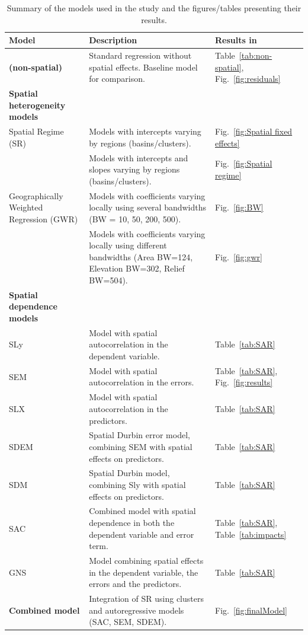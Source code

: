 \documentclass[lineno,pdflatex,sn-basic]{sn-jnl}%
\theoremstyle{thmstyleone}%
\theoremstyle{thmstyletwo}%
\theoremstyle{thmstylethree}%
\begin{document}
\begin{table}[htbp]
\centering
\caption{Summary of the models used in the study and the figures/tables presenting their results.}
\label{tab:model_summary}
\begin{tabular}{p{4cm} p{6cm} p{3cm}}
\toprule
\textbf{Model} & \textbf{Description} & \textbf{Results in} \\
\midrule
\textbf{(non-spatial)} & Standard regression without spatial effects. Baseline model for comparison. & Table~\ref{tab:non-spatial}, Fig.~\ref{fig:residuals} \\
\textbf{Spatial heterogeneity models} &  &  \\
\quad Spatial Regime (SR) & Models with intercepts varying by regions (basins/clusters). & Fig.~\ref{fig:Spatial fixed effects} \\
\quad  & Models with intercepts and slopes varying by regions (basins/clusters). & Fig.~\ref{fig:Spatial regime} \\
\quad Geographically Weighted Regression (GWR) & Models with coefficients varying locally using several bandwidths (BW = 10, 50, 200, 500). & Fig.~\ref{fig:BW} \\
\quad & Models with coefficients varying locally using different bandwidths (Area BW=124, Elevation BW=302, Relief BW=504). & Fig.~\ref{fig:gwr} \\
\textbf{Spatial dependence models} &  &  \\
\quad SLy & Model with spatial autocorrelation in the dependent variable. & Table~\ref{tab:SAR} \\
\quad SEM & Model with spatial autocorrelation in the errors. & Table~\ref{tab:SAR}, Fig.~\ref{fig:results} \\
\quad SLX & Model with spatial autocorrelation in the predictors. & Table~\ref{tab:SAR} \\
\quad SDEM & Spatial Durbin error model, combining SEM with spatial effects on predictors. & Table~\ref{tab:SAR} \\
\quad SDM & Spatial Durbin model, combining Sly with spatial effects on predictors. & Table~\ref{tab:SAR} \\
\quad SAC & Combined model with spatial dependence in both the dependent variable and error term. & Table~\ref{tab:SAR}, Table~\ref{tab:impacts} \\
\quad GNS & Model combining spatial effects in the dependent variable, the errors and the predictors. & Table~\ref{tab:SAR} \\
\textbf{Combined model} & Integration of SR using clusters and autoregressive models (SAC, SEM, SDEM). & Fig.~\ref{fig:finalModel} \\
\bottomrule
\end{tabular}
\end{table}
\end{document}
